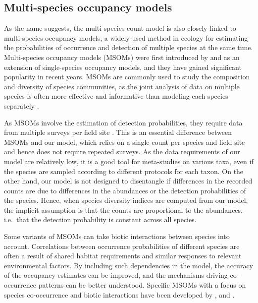 \documentclass{article}
\begin{document}
\subsection{Multi-species occupancy models}

As the name suggests, the multi-species count model is also closely linked to multi-species occupancy models, a widely-used method in ecology for estimating the probabilities of occurrence and detection of multiple species at the same time. Multi-species occupancy models (MSOMs) were first introduced by \citet{mackenzieInvestigating2004} and \citet{dorazioEstimating2005} as an extension of single-species occupancy models, and they have gained significant popularity in recent years. MSOMs are commonly used to study the composition and diversity of species communities, as the joint analysis of data on multiple species is often more effective and informative than modeling each species separately \citep{devarajanMultispecies2020}.

As MSOMs involve the estimation of detection probabilities, they require data from multiple surveys per field site \citep{devarajanMultispecies2020}. This is an essential difference between MSOMs and our model, which relies on a single count per species and field site and hence does not require repeated surveys. As the data requirements of our model are relatively low, it is a good tool for meta-studies on various taxa, even if the species are sampled according to different protocols for each taxon. On the other hand, our model is not designed to disentangle if differences in the recorded counts are due to differences in the abundances or the detection probabilities of the species. Hence, when species diversity indices are computed from our model, the implicit assumption is that the counts are proportional to the abundances, i.e.~that the detection probability is constant across all species.

Some variants of MSOMs can take biotic interactions between species into account. Correlations between occurrence probabilities of different species are often a result of shared habitat requirements and similar responses to relevant environmental factors. By including such dependencies in the model, the accuracy of the occupancy estimates can be improved, and the mechanisms driving co-occurrence patterns can be better understood. Specific MSOMs with a focus on species co-occurrence and biotic interactions have been developed by \citet{mackenzieInvestigating2004}, \citet{waddleNew2010} and \citet{rotaMultispecies2016}.
\end{document}
